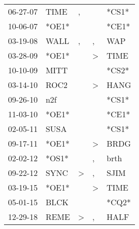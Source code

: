 \begin{supertabular}{p{0.07\textwidth}p{0.06\textwidth}p{0.02\textwidth}p{0.02\textwidth}p{0.06\textwidth}}
 06-27-07\textsuperscript{} &           TIME\textsuperscript{} &                , &               &                            *CS1* \\
 10-06-07\textsuperscript{} &                            *OE1* &                  &               &                            *CE1* \\
 03-19-08\textsuperscript{} &           WALL\textsuperscript{} &                , &             , &            WAP\textsuperscript{} \\
 03-28-09\textsuperscript{} &                            *OE1* &                  &  \textgreater &           TIME\textsuperscript{} \\
 10-10-09\textsuperscript{} &           MITT\textsuperscript{} &                  &               &                            *CS2* \\
 03-14-10\textsuperscript{} &           ROC2\textsuperscript{} &                  &  \textgreater &           HANG\textsuperscript{} \\
 09-26-10\textsuperscript{} &            n2f\textsuperscript{} &                  &               &                            *CS1* \\
 11-03-10\textsuperscript{} &                            *OE1* &                  &               &                            *CE1* \\
 02-05-11\textsuperscript{} &           SUSA\textsuperscript{} &                  &               &                            *CS1* \\
 09-17-11\textsuperscript{} &                            *OE1* &                  &  \textgreater &           BRDG\textsuperscript{} \\
 02-02-12\textsuperscript{} &                            *OS1* &                  &             , &           brth\textsuperscript{} \\
 09-22-12\textsuperscript{} &           SYNC\textsuperscript{} &     \textgreater &             , &           SJIM\textsuperscript{} \\
 03-19-15\textsuperscript{} &                            *OE1* &                  &  \textgreater &           TIME\textsuperscript{} \\
 05-01-15\textsuperscript{} &           BLCK\textsuperscript{} &                  &               &                            *CQ2* \\
 12-29-18\textsuperscript{} &           REME\textsuperscript{} &     \textgreater &             , &           HALF\textsuperscript{} \\
\end{supertabular}
